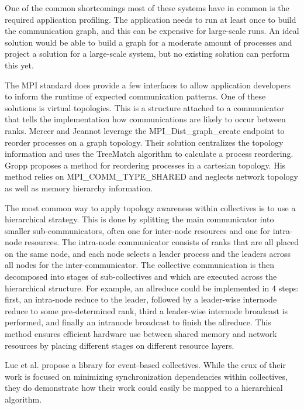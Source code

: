 One of the common shortcomings most of these systems have in common is the required application profiling.
The application needs to run at least once to build the communication graph, and this can be expensive for large-scale runs. 
An ideal solution would be able to build a graph for a moderate amount of processes and project a solution for a large-scale system, but no existing solution can perform this yet. 

The MPI standard does provide a few interfaces to allow application developers to inform the runtime of expected communication patterns.  
One of these solutions is virtual topologies. 
This is a structure attached to a communicator that tells the implementation how communications are likely to occur between ranks.
Mercer and Jeannot \cite{Mercer2011ImprvMPIWithRR} leverage the MPI\_Dist\_graph\_create endpoint to reorder processes on a graph topology.
Their solution centralizes the topology information and uses the TreeMatch algorithm \cite{Jeannot2010TreeMatch} to calculate a process reordering.
Gropp \cite{Gropp2019CartTopoMapping} proposes a method for reordering processes in a cartesian topology.
His method relies on MPI\_COMM\_TYPE\_SHARED and neglects network topology as well as memory hierarchy information.

The most common way to apply topology awareness within collectives is to use a hierarchical strategy.
This is done by splitting the main communicator into smaller sub-communicators, often one for inter-node resources and one for intra-node resources.
The intra-node communicator consists of ranks that are all placed on the same node, and each node selects a leader process and the leaders across all nodes for the inter-communicator.
The collective communication is then decomposed into stages of sub-collectives and  which are executed across the hierarchical structure.
For example, an allreduce could be implemented in 4 steps: first, an intra-node reduce to the leader, followed by a leader-wise internode reduce to some pre-determined rank, third a leader-wise internode broadcast is performed, and finally an intranode broadcast to finish the allreduce.
This method ensures efficient hardware use between shared memory and network resources by placing different stages on different resource layers.

Lue et al. \cite{Luo2018ADAPT} propose a library for event-based collectives.
While the crux of their work is focused on minimizing synchronization dependencies within collectives, they do demonstrate how their work could easily be mapped to a hierarchical algorithm.

